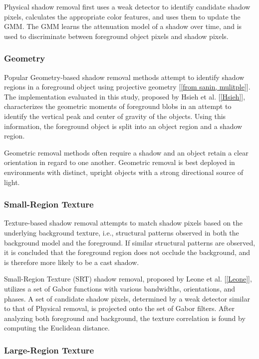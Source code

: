 \documentclass[12pt]{report}
\begin{document}
Physical shadow removal first uses a weak detector to identify candidate shadow pixels, calculates the appropriate color features, and uses them to update the GMM. The GMM learns the attenuation model of a shadow over time, and is used to discriminate between foreground object pixels and shadow pixels.

\subsubsection{Geometry}

Popular Geometry-based shadow removal methods attempt to identify shadow regions in a foreground object using projective geometry [\ref{from sanin, mulitple}]. The implementation evaluated in this study, proposed by Hsieh et al. [\ref{Hsieh}], characterizes the geometric moments of foreground blobs in an attempt to identify the vertical peak and center of gravity of the objects. Using this information, the foreground object is split into an object region and a shadow region.

Geometric removal methods often require a shadow and an object retain a clear orientation in regard to one another. Geometric removal is best deployed in environments with distinct, upright objects with a strong directional source of light.  

\subsubsection{Small-Region Texture}

Texture-based shadow removal attempts to match shadow pixels based on the underlying background texture, i.e., structural patterns observed in both the background model and the foreground. If similar structural patterns are observed, it is concluded that the foreground region does not occlude the background, and is therefore more likely to be a cast shadow.

Small-Region Texture (SRT) shadow removal, proposed by Leone et al. [\ref{Leone}], utilizes a set of Gabor functions with various bandwidths, orientations, and phases. A set of candidate shadow pixels, determined by a weak detector similar to that of Physical removal, is projected onto the set of Gabor filters. After analyzing both foreground and background, the texture correlation is found by computing the Euclidean distance.

\subsubsection{Large-Region Texture}
\end{document}
